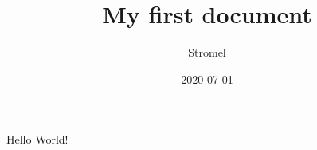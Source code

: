 \documentclass{article}
\title{My first document}
\date{2020-07-01}
\author{Stromel}
\begin{document}
	\maketitle
	\newpage
	
	Hello World!
\end{document}
